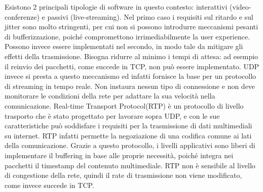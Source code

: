 Esistono 2 principali tipologie di software in questo contesto: interattivi (video-conferenze) e passivi (live-streaming). Nel primo caso i requisiti sul ritardo
e sul jitter sono molto stringenti, per cui non si possono introdurre meccanismi pesanti di bufferizzazione, poiché compromettono irrimediabilmente la user experience. Possono invece essere implementati nel secondo, in modo tale da mitigare gli effetti della trasmissione. Bisogna ridurre al minimo i tempi di attesa: ad esempio il reinvio dei pacchetti, come succede in TCP, non può essere implementato. UDP invece si presta a questo meccanismo ed infatti fornisce la base per un protocollo di streaming in tempo reale. Non instaura nessun tipo di connessione e non deve monitorare le condizioni della rete per adattare la sua velocità nella comunicazione. Real-time Transport Protocol(RTP) è un protocollo di livello trasporto\cite{a10rfc3550} %
che è stato progettato per lavorare sopra UDP, e con le sue caratteristiche può soddisfare i requisiti per la trasmissione di dati multimediali su internet. RTP infatti permette la negoziazione di una codifica comune ai lati della comunicazione. Grazie a questo protocollo, i livelli applicativi sono liberi di implementare il buffering in base alle proprie necessità, poiché integra nei pacchetti il timestamp del contenuto multimediale. RTP non è sensibile al livello di congestione della rete, quindi il rate di trasmissione non viene modificato, come invece succede in TCP. %

